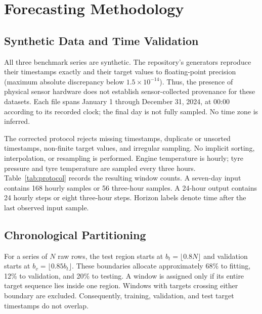 \documentclass[conference]{IEEEtran}
\begin{document}
\section{Forecasting Methodology}
\subsection{Synthetic Data and Time Validation}
All three benchmark series are synthetic. The repository's generators reproduce their timestamps exactly and their target values to floating-point precision (maximum absolute discrepancy below $1.5\times10^{-14}$). Thus, the presence of physical sensor hardware does not establish sensor-collected provenance for these datasets. Each file spans January 1 through December 31, 2024, at 00:00 according to its recorded clock; the final day is not fully sampled. No time zone is inferred.

The corrected protocol rejects missing timestamps, duplicate or unsorted timestamps, non-finite target values, and irregular sampling. No implicit sorting, interpolation, or resampling is performed. Engine temperature is hourly; tyre pressure and tyre temperature are sampled every three hours. Table~\ref{tab:protocol} records the resulting window counts. A seven-day input contains 168 hourly samples or 56 three-hour samples. A 24-hour output contains 24 hourly steps or eight three-hour steps. Horizon labels denote time after the last observed input sample.

\begin{table}[!t]
\caption{Dataset and protocol summary. Train, validation, and test columns count complete forecast windows; every dataset is synthetic.}
\label{tab:protocol}
\centering\small
\setlength{\tabcolsep}{4pt}

\end{table}

\subsection{Chronological Partitioning}
For a series of $N$ raw rows, the test region starts at $b_t=\lfloor0.8N\rfloor$ and validation starts at $b_v=\lfloor0.85b_t\rfloor$. These boundaries allocate approximately 68\% to fitting, 12\% to validation, and 20\% to testing. A window is assigned only if its entire target sequence lies inside one region. Windows with targets crossing either boundary are excluded. Consequently, training, validation, and test target timestamps do not overlap.
\end{document}

